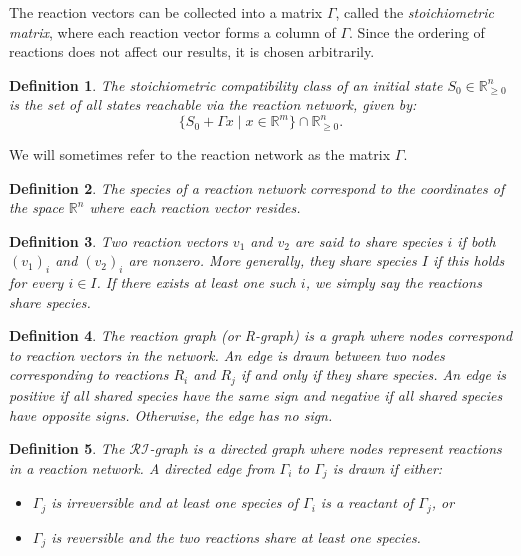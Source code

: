 \documentclass{article}
\newtheorem{define}{Definition}
\begin{document}
The reaction vectors can be collected into a matrix \( \Gamma \), called the \textit{stoichiometric matrix}, where each reaction vector forms a column of \( \Gamma \). Since the ordering of reactions does not affect our results, it is chosen arbitrarily.

\begin{define}
    The \textit{stoichiometric compatibility class} of an initial state \( S_0 \in \mathbb{R}^n_{\geq 0} \) is the set of all states reachable via the reaction network, given by:
    \[
    \{S_0 + \Gamma x \mid x \in \mathbb{R}^m\} \cap \mathbb{R}^n_{\geq 0}.
    \]
\end{define}

We will sometimes refer to the reaction network as the matrix $\Gamma$.
\begin{define}
    The \textit{species} of a reaction network correspond to the coordinates of the space $\mathbb{R}^n$ where each reaction vector resides.
    
\end{define}




\begin{define}
    Two reaction vectors $v_1$ and $v_2$ are said to \textit{share species $i$} if both $(v_1)_i$ and $(v_2)_i$ are nonzero. More generally, they \textit{share species $I$} if this holds for every $i \in I$. If there exists at least one such $i$, we simply say the reactions \textit{share species}.
    
\end{define}
\begin{define}
    The \textit{reaction graph} (or \textit{R-graph}) is a graph where nodes correspond to reaction vectors in the network. An edge is drawn between two nodes corresponding to reactions $R_i$ and $R_j$ if and only if they share species. An edge is positive if all shared species have the same sign and negative if all shared species have opposite signs. Otherwise, the edge has no sign.
\end{define}

\begin{define}
    The \textit{$\mathcal{RI}$-graph} is a directed graph where nodes represent reactions in a reaction network. A directed edge from $\Gamma_i$ to $\Gamma_j$ is drawn if either:
    \begin{itemize}
        \item $\Gamma_j$ is irreversible and at least one species of $\Gamma_i$ is a reactant of $\Gamma_j$, or
        \item $\Gamma_j$ is reversible and the two reactions share at least one species.
    \end{itemize}
\end{define}
\end{document}
